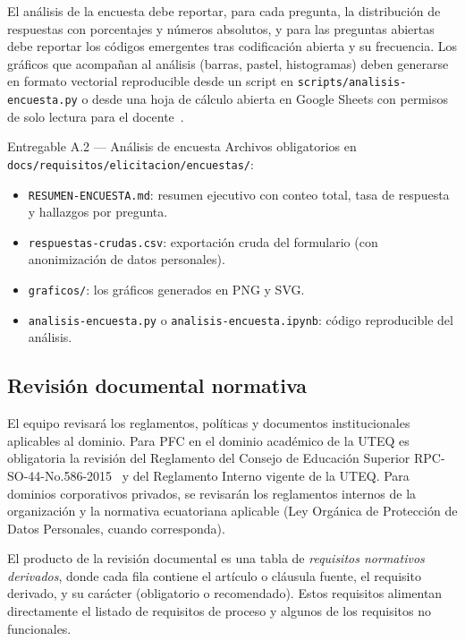 \documentclass[11pt,a4paper]{article}
\begin{document}
El an\'alisis de la encuesta debe reportar, para cada pregunta, la distribuci\'on de respuestas con porcentajes y n\'umeros absolutos, y para las preguntas abiertas debe reportar los c\'odigos emergentes tras codificaci\'on abierta y su frecuencia. Los gr\'aficos que acompa\~nan al an\'alisis (barras, pastel, histogramas) deben generarse en formato vectorial reproducible desde un script en \texttt{scripts/analisis-encuesta.py} o desde una hoja de c\'alculo abierta en Google Sheets con permisos de solo lectura para el docente~\cite{kitchenham2008surveys}.

\begin{cajaentregable}{Entregable A.2 --- An\'alisis de encuesta}
Archivos obligatorios en \texttt{docs/requisitos/elicitacion/encuestas/}:
\begin{itemize}
    \item \texttt{RESUMEN-ENCUESTA.md}: resumen ejecutivo con conteo total, tasa de respuesta y hallazgos por pregunta.
    \item \texttt{respuestas-crudas.csv}: exportaci\'on cruda del formulario (con anonimizaci\'on de datos personales).
    \item \texttt{graficos/}: los gr\'aficos generados en PNG y SVG.
    \item \texttt{analisis-encuesta.py} o \texttt{analisis-encuesta.ipynb}: c\'odigo reproducible del an\'alisis.
\end{itemize}
\end{cajaentregable}

\subsection{Revisi\'on documental normativa}

El equipo revisar\'a los reglamentos, pol\'iticas y documentos institucionales aplicables al dominio. Para PFC en el dominio acad\'emico de la UTEQ es obligatoria la revisi\'on del Reglamento del Consejo de Educaci\'on Superior RPC-SO-44-No.586-2015~\cite{ces2015reglamento} y del Reglamento Interno vigente de la UTEQ. Para dominios corporativos privados, se revisar\'an los reglamentos internos de la organizaci\'on y la normativa ecuatoriana aplicable (Ley Org\'anica de Protecci\'on de Datos Personales, cuando corresponda).

El producto de la revisi\'on documental es una tabla de \emph{requisitos normativos derivados}, donde cada fila contiene el art\'iculo o cl\'ausula fuente, el requisito derivado, y su car\'acter (obligatorio o recomendado). Estos requisitos alimentan directamente el listado de requisitos de proceso y algunos de los requisitos no funcionales.
\end{document}
